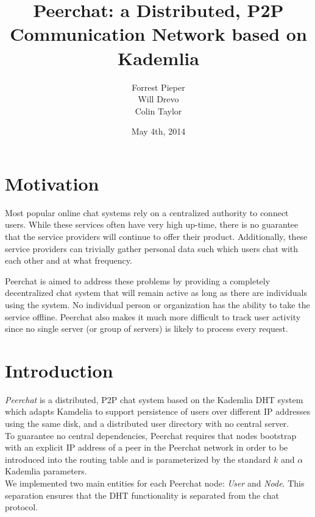 \documentclass{article}
\title{Peerchat: a Distributed, P2P Communication Network based on Kademlia}
\author{
  Forrest Pieper\\
  Will Drevo\\
  Colin Taylor
}
\date{May 4th, 2014}
\begin{document}
\maketitle

\section{Motivation}
\label{Motivation}

Most popular online chat systems rely on a centralized authority to connect users. While these services often have very high up-time, there is no guarantee that the service providers will continue to offer their product. Additionally, these service providers can trivially gather personal data such which users chat with each other and at what frequency. 

Peerchat is aimed to address these problems by providing a completely decentralized chat system that will remain active as long as there are individuals using the system. No individual person or organization has the ability to take the service offline. Peerchat also makes it much more difficult to track user activity since no single server (or group of servers) is likely to process every request.  


\section{Introduction}

\textit{Peerchat} is a distributed, P2P chat system based on the Kademlia DHT \cite{Maymounkov02} system which adapts Kamdelia to support persistence of users over different IP addresses using the same disk, and a distributed user directory with no central server. \\

To guarantee no central dependencies, Peerchat requires that nodes bootstrap with an explicit IP address of a peer in the Peerchat network in order to be introduced into the routing table and is parameterized by the standard $k$ and $\alpha$ Kademlia parameters. \\

We implemented two main entities for each Peerchat node: \textit{User} and \textit{Node}. This separation ensures that the DHT functionality is separated from the chat protocol. 
\end{document}
